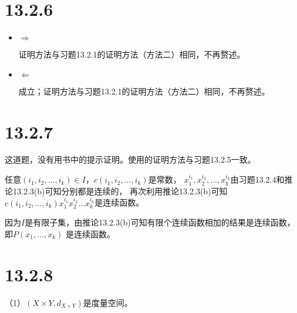 \documentclass{article}
\begin{document}
\section*{13.2.6}

\begin{itemize}
  \item $\Rightarrow$

        证明方法与习题13.2.1的证明方法（方法二）相同，不再赘述。

  \item $\Leftarrow$

        成立；证明方法与习题13.2.1的证明方法（方法二）相同，不再赘述。
\end{itemize}

\section*{13.2.7}

这道题，没有用书中的提示证明。使用的证明方法与习题13.2.5一致。

任意$(i_1, i_2, \dots, i_k) \in I$，$c(i_1, i_2, \dots, i_k)$是常数，
$x_1^{i_1}, x_2^{i_2}, \dots, x_k^{i_k}$由习题13.2.4和推论13.2.3(b)可知分别都是连续的，
再次利用推论13.2.3(b)可知$c(i_1, i_2, \dots, i_k)x_1^{i_1}x_2^{i_2}\dots x_k^{i_k}$是连续函数。

因为$I$是有限子集，由推论13.2.3(b)可知有限个连续函数相加的结果是连续函数，即$P(x_1, \dots, x_k)$
是连续函数。

\section*{13.2.8}

（1）$(X \times Y, d_{X \times Y})$是度量空间。
\end{document}
